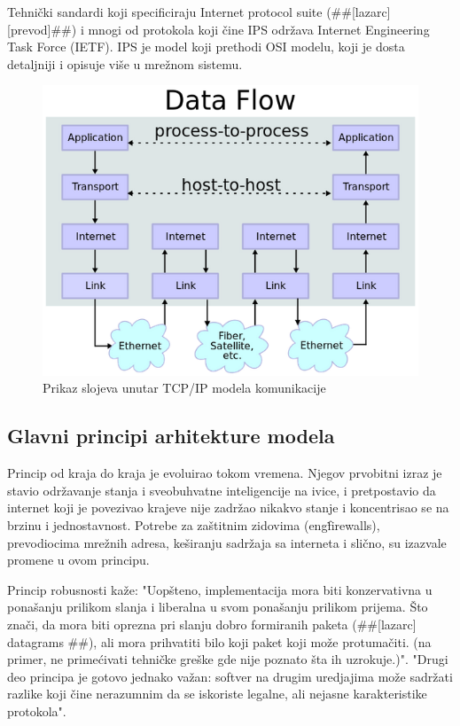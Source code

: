 \documentclass[a4paper,12pt, master]{etf}
\begin{document}
	Tehni\v{c}ki sandardi koji specificiraju Internet protocol suite
	(\#\#[lazarc] [prevod]\#\#) i mnogi od protokola koji \v{c}ine IPS
	odr\v{z}ava Internet Engineering Task Force (IETF). IPS je model koji
	prethodi OSI modelu, koji je dosta detaljniji i opisuje vi\v{s}e u
	mre\v{z}nom sistemu.

	\begin{figure}[htb]
			\centering
			\includegraphics[scale=.5]{../pic/tcpip_model.png}
			\caption{Prikaz slojeva unutar TCP/IP modela komunikacije}
			\label{fig:tcpip_model}
	\end{figure}

	\subsection{Glavni principi arhitekture modela}

	Princip od kraja do kraja je evoluirao tokom vremena. Njegov prvobitni
	izraz je stavio	odr\v{z}avanje stanja i sveobuhvatne inteligencije na ivice,
	 i pretpostavio da internet koji je	povezivao krajeve nije zadr\v{z}ao
	nikakvo stanje i koncentrisao se na brzinu i jednostavnost. Potrebe za
	za\v{s}titnim zidovima (eng\. firewalls), prevodiocima mre\v{z}nih adresa,
    ke\v{s}iranju sadr\v{z}aja sa interneta i sli\v{c}no, su izazvale promene u
    ovom principu.

	Princip robusnosti ka\v{z}e: "Uop\v{s}teno, implementacija mora biti
	konzervativna u pona\v{s}anju prilikom slanja i liberalna u svom
	pona\v{s}anju prilikom prijema. \v{S}to zna\v{c}i, da mora biti
	oprezna pri slanju dobro formiranih paketa (\#\#[lazarc] datagrams \#\#),
	ali mora prihvatiti bilo koji paket koji mo\v{z}e protuma\v{c}iti. (na
	primer, ne prime\'{c}ivati tehni\v{c}ke gre\v{s}ke gde nije poznato \v{s}ta
	ih uzrokuje.)". "Drugi deo principa je gotovo jednako va\v{z}an: softver na
	drugim uredjajima mo\v{z}e sadr\v{z}ati razlike koji \v{c}ine nerazumnim da
	se iskoriste legalne, ali nejasne karakteristike protokola".
\end{document}
